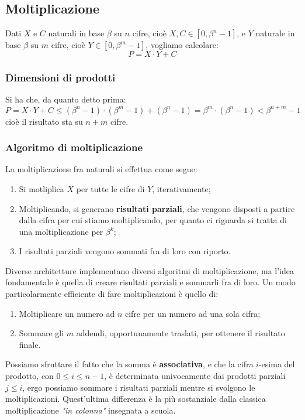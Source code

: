 \documentclass[a4paper,11pt]{article}
\begin{document}
\subsection{Moltiplicazione}
Dati $X$ e $C$ naturali in base $\beta$ su $n$ cifre, cioè $X,C \in [0, \beta^n - 1]$, e $Y$ naturale in base $\beta$ su $m$ cifre, cioè $Y \in [0, \beta^m - 1]$, vogliamo calcolare:
$$
P = X \cdot Y + C 
$$

\subsubsection{Dimensioni di prodotti}
Si ha che, da quanto detto prima:
$$
P = X \cdot Y + C \leq (\beta^n - 1) \cdot (\beta^m - 1) + (\beta^n - 1) = \beta^m \cdot (\beta^n - 1) < \beta^{n+m} - 1 
$$
cioè il risultato sta su $n+m$ cifre.

\subsubsection{Algoritmo di moltiplicazione}
La moltiplicazione fra naturali si effettua come segue:

\begin{enumerate}
	\item Si motliplica $X$ per tutte le cifre di $Y$, iterativamente;
	\item Moltiplicando, si generano \textbf{risultati parziali}, che vengono disposti a partire dalla cifra per cui stiamo moltiplicando, per quanto ci riguarda si tratta di una moltiplicazione per $\beta^k$;
	\item I risultati parziali vengono sommati fra di loro con riporto.
\end{enumerate}

Diverse architetture implementano diversi algoritmi di moltiplicazione, ma l'idea fondamentale è quella di creare risultati parziali e sommarli fra di loro.
Un modo particolarmente efficiente di fare moltiplicazioni è quello di:
\begin{enumerate}
	\item Moltiplicare un numero ad $n$ cifre per un numero ad una sola cifra;
	\item Sommare gli $m$ addendi, opportunamente traslati, per ottenere il risultato finale.
\end{enumerate}

Possiamo sfruttare il fatto che la somma è \textbf{associativa}, e che la cifra $i$-esima del prodotto, con $0 \leq i \leq n - 1$, è determinata univocamente dai prodotti parziali $j \leq i$, ergo possiamo sommare i risultati parziali mentre si svolgono le moltiplicazioni. 
Quest'ultima differenza è la più sostanziale dalla classica moltiplicazione \textit{"in colonna"} insegnata a scuola.
\end{document}
